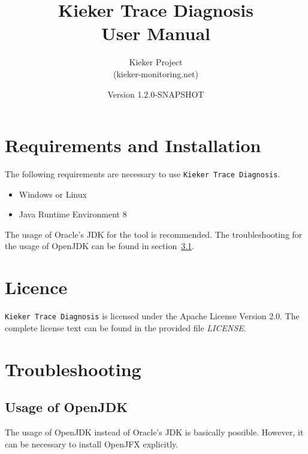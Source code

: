 \documentclass{article}
\title{Kieker Trace Diagnosis\\User Manual}
\date{Version 1.2.0-SNAPSHOT}
\author{Kieker Project\\(kieker-monitoring.net)}
\begin{document}
  \newcommand{\KiekerTraceDiagnosis}[0]{\texttt{Kieker Trace Diagnosis}}
  \newcommand{\file}[1]{\textit{#1}}

  \maketitle

  \section{Requirements and Installation}
  The following requirements are necessary to use \KiekerTraceDiagnosis{}.
  \begin{itemize}
    \item Windows or Linux
    \item Java Runtime Environment 8
  \end{itemize}
  The usage of Oracle's JDK for the tool is recommended. The troubleshooting for the usage of OpenJDK can be found in section~\ref{OpenJDK}.

  \section{Licence}
  \KiekerTraceDiagnosis{} is licensed under the Apache License Version 2.0. The complete license text can be found in the provided file \file{LICENSE}.

  \section{Troubleshooting}

  \subsection{Usage of OpenJDK}\label{OpenJDK}
  The usage of OpenJDK instead of Oracle's JDK is basically possible. However, it can be necessary to install OpenJFX explicitly.
\end{document}
